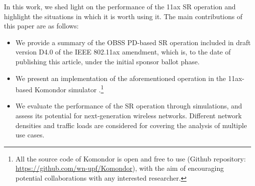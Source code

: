 \documentclass{article}
\begin{document}
    \begin{table}[]
    	\centering
    	\caption{Effect of increasing the OBSS/PD threshold and the transmission power.}
    	\label{tbl:effects_sr}
    \end{table}
	
    In this work, we shed light on the performance of the 11ax SR operation and highlight the situations in which it is worth using it. The main contributions of this paper are as follows:
	\begin{itemize}
		\item We provide a summary of the OBSS PD-based SR operation included in draft version D4.0 of the IEEE 802.11ax amendment, which is, to the date of publishing this article, under the initial sponsor ballot phase.
		\item We present an implementation of the aforementioned operation in the 11ax-based Komondor simulator \cite{komondor}.\footnote{All the source code of Komondor is open and free to use (Github repository: \url{https://github.com/wn-upf/Komondor}), with the aim of encouraging potential collaborations with any interested researcher.}
		\item We evaluate the performance of the SR operation through simulations, and assess its potential for next-generation wireless networks. Different network densities and traffic loads are considered for covering the analysis of multiple use cases.
	\end{itemize}
	
\end{document}
